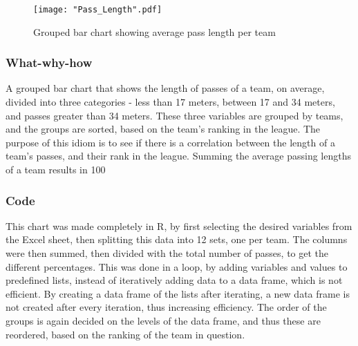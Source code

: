 \documentclass[Report.tex]{subfiles}
\begin{document}
\begin{figure}
\center
\texttt{[image: "Pass\_Length".pdf]}
\caption{Grouped bar chart showing average pass length per team}
\label{Fig:Pass_Length}
\end{figure}



\subsubsection{What-why-how}
A grouped bar chart that shows the length of passes of a team, on average,
divided into three categories - less than 17 meters, between 17 and 34 meters,
and passes greater than 34 meters. These three variables are grouped by teams,
and the groups are sorted, based on the team's ranking in the league.
The purpose of this idiom is to see if there is a correlation between the length
of a team's passes, and their rank in the league.
Summing the average passing lengths of a team results in 100%

\subsubsection{Code}
This chart was made completely in R, by first selecting the desired variables
from the Excel sheet, then splitting this data into 12 sets, one per team. 
The columns were then summed, then divided with the total number of passes, to
get the different percentages. This was done in a loop, by adding variables and
values to predefined lists, instead of iteratively adding data to a data frame,
which is not efficient. By creating a data frame of the lists after iterating,
a new data frame is not created after every iteration, thus increasing
efficiency.
The order of the groups is again decided on the levels of the data frame, and
thus these are reordered, based on the ranking of the team in question.
\end{document}
